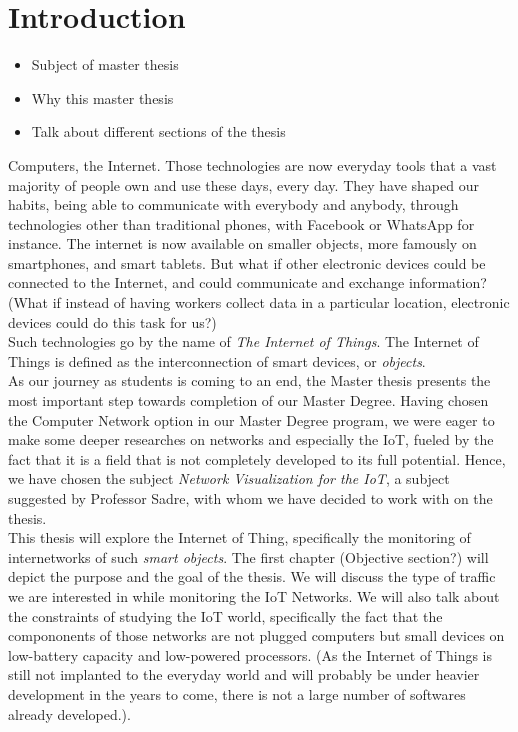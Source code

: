 \chapter*{Introduction}

\begin{itemize}
	\item Subject of master thesis
	\item Why this master thesis
	\item Talk about different sections of the thesis
\end{itemize}

Computers, the Internet. Those technologies are now everyday tools that a vast majority of people own and use these days, every day. They have shaped our habits, being able to communicate with everybody and anybody, through technologies other than traditional phones, with Facebook or WhatsApp for instance. The internet is now available on smaller objects, more famously on smartphones, and smart tablets. But what if other electronic devices could be connected to the Internet, and could communicate and exchange information? (What if instead of having workers collect data in a particular location, electronic devices could do this task for us?)\\

Such technologies go by the name of \textit{The Internet of Things}. The Internet of Things is defined as the interconnection of smart devices, or \textit{objects}. \\

As our journey as students is coming to an end, the Master thesis presents the most important step towards completion of our Master Degree.  Having chosen the Computer Network option in our Master Degree program, we were eager to make some deeper researches on networks and especially the IoT, fueled by the fact that it is a field that is not completely developed to its full potential. Hence, we have chosen the subject \textit{Network Visualization for the IoT}, a subject suggested by Professor Sadre, with whom we have decided to work with on the thesis. \\

This thesis will explore the Internet of Thing, specifically the monitoring of internetworks of such \textit{smart objects}. The first chapter (Objective section?) will depict the purpose and the goal of the thesis. We will discuss the type of traffic we are interested in while monitoring the IoT Networks. We will also talk about the constraints of studying the IoT world, specifically the fact that the compononents of those networks are not plugged computers but small devices on low-battery capacity and low-powered processors. (As the Internet of Things is still not implanted to the everyday world and will probably be under heavier development in the years to come, there is not a large number of softwares already developed.).\\


